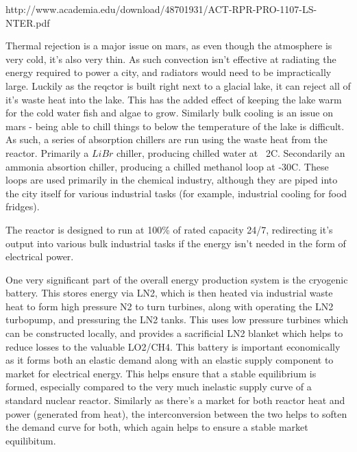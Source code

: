 \documentclass[10pt]{article}
\begin{document}
http://www.academia.edu/download/48701931/ACT-RPR-PRO-1107-LS-NTER.pdf

Thermal rejection is a major issue on mars, as even though the atmosphere is very cold, it's also very thin. As such convection isn't effective at radiating the energy required to power a city, and radiators would need to be impractically large. Luckily as the reqctor is built right next to a glacial lake, it can reject all of it's waste heat into the lake. This has the added effect of keeping the lake warm for the cold water fish and algae to grow. Similarly bulk cooling is an issue on mars - being able to chill things to below the temperature of the lake is difficult. As such, a series of absorption chillers are run using the waste heat from the reactor. Primarily a $LiBr$ chiller, producing chilled water at ~2C. Secondarily an ammonia absortion chiller, producing a chilled methanol loop at -30C. These loops are used primarily in the chemical industry, although they are piped into the city itself for various industrial tasks (for example, industrial cooling for food fridges).

The reactor is designed to run at 100\% of rated capacity 24/7, redirecting it's output into various bulk industrial tasks if the energy isn't needed in the form of electrical power.

One very significant part of the overall energy production system is the cryogenic battery. This stores energy via LN2, which is then heated via industrial waste heat to form high pressure N2 to turn turbines, along with operating the LN2 turbopump, and pressuring the LN2 tanks. This uses low pressure turbines which can be constructed locally, and provides a sacrificial LN2 blanket which helps to reduce losses to the valuable LO2/CH4. This battery is important economically as it forms both an elastic demand along with an elastic supply component to market for electrical energy. This helps ensure that a stable equilibrium is formed, especially compared to the very much inelastic supply curve of a standard nuclear reactor. Similarly as there's a market for both reactor heat and power (generated from heat), the interconversion between the two helps to soften the demand curve for both, which again helps to ensure a stable market equilibitum.
\end{document}
